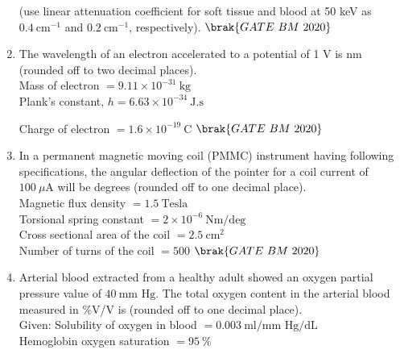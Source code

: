 \documentclass[journal,12pt,onecolumn]{IEEEtran}
\theoremstyle{remark}
\begin{document}
\begin{enumerate}
(use linear attenuation coefficient for soft tissue and blood at 50 keV as 
$0.4 \ \text{cm}^{-1}$ and $0.2 \ \text{cm}^{-1}$, respectively).  \hfill $\brak{GATE\ BM\ 2020}$\\

\item The wavelength of an electron accelerated to a potential of 1 V is \underline{\hspace{2cm}}nm 
(rounded off to two decimal places).\\

Mass of electron $= 9.11 \times 10^{-31} \ \text{kg}$\\

Plank's constant, $h = 6.63 \times 10^{-34} \ \text{J.s}$

Charge of electron $= 1.6 \times 10^{-19} \ \text{C}$  \hfill $\brak{GATE\ BM\ 2020}$\\

\item In a permanent magnetic moving coil (PMMC) instrument having following 
specifications, the angular deflection of the pointer for a coil current of 
$100 \ \mu\text{A}$ will be \underline{\hspace{2cm}} degrees 
(rounded off to one decimal place).\\

Magnetic flux density $= 1.5 \ \text{Tesla}$\\

Torsional spring constant $= 2 \times 10^{-6} \ \text{Nm/deg}$\\

Cross sectional area of the coil $= 2.5 \ \text{cm}^2$\\

Number of turns of the coil $= 500$  \hfill $\brak{GATE\ BM\ 2020}$\\

\item Arterial blood extracted from a healthy adult showed an oxygen partial pressure 
value of $40 \ \text{mm Hg}$. The total oxygen content in the arterial blood measured 
in \%V/V is \underline{\hspace{2cm}}  (rounded off to one decimal place).\\

Given: Solubility of oxygen in blood $= 0.003 \ \text{ml/mm Hg/dL}$\\

Hemoglobin oxygen saturation $= 95 \ \%$\\


\end{enumerate}
\end{document}
